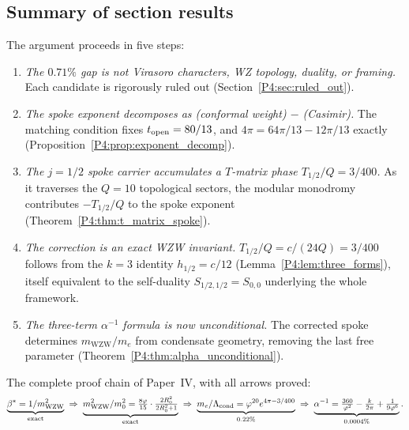 \documentclass[11pt,a4paper]{article}
\theoremstyle{definition}
\theoremstyle{remark}
\newcommand{\vp}{\varphi}
\newcommand{\bst}{\beta^{*}}
\newcommand{\aInv}{\alpha^{-1}}
\newcommand{\Lcond}{\Lambda_{\mathrm{cond}}}
\newcommand{\mWZW}{m_{\mathrm{WZW}}}
\begin{document}
\subsection{Summary of section results}
\label{P4:sec:t_matrix_summary}

The argument proceeds in five steps:

\begin{enumerate}[noitemsep]

\item
  \emph{The $0.71\%$ gap is not Virasoro characters, WZ topology, duality, or framing.}
  Each candidate is rigorously ruled out (Section~\ref{P4:sec:ruled_out}).

\item
  \emph{The spoke exponent decomposes as (conformal weight) $-$ (Casimir).}
  The matching condition fixes $t_{\rm open}=80/13$, and $4\pi = 64\pi/13 - 12\pi/13$
  exactly (Proposition~\ref{P4:prop:exponent_decomp}).

\item
  \emph{The $j=1/2$ spoke carrier accumulates a $T$-matrix phase $T_{1/2}/Q = 3/400$.}
  As it traverses the $Q=10$ topological sectors, the modular monodromy
  contributes $-T_{1/2}/Q$ to the spoke exponent (Theorem~\ref{P4:thm:t_matrix_spoke}).

\item
  \emph{The correction is an exact WZW invariant.}
  $T_{1/2}/Q = c/(24Q) = 3/400$ follows from the $k=3$ identity
  $h_{1/2}=c/12$ (Lemma~\ref{P4:lem:three_forms}), itself equivalent to the
  self-duality $S_{1/2,1/2}=S_{0,0}$ underlying the whole framework.

\item
  \emph{The three-term $\aInv$ formula is now unconditional.}
  The corrected spoke determines $\mWZW/m_e$ from condensate geometry,
  removing the last free parameter (Theorem~\ref{P4:thm:alpha_unconditional}).

\end{enumerate}

The complete proof chain of Paper~IV, with all arrows proved:
\begin{equation}
  \underbrace{\bst = 1/\mWZW^2}_{\rm exact}
  \;\Rightarrow\;
  \underbrace{\mWZW^2/m_0^2 = \tfrac{8\vp}{15}\cdot\tfrac{2R_0^2}{2R_0^2+1}}_{\rm exact}
  \;\Rightarrow\;
  \underbrace{m_e/\Lcond = \vp^{20}e^{4\pi-3/400}}_{0.22\%}
  \;\Rightarrow\;
  \underbrace{\aInv = \tfrac{360}{\vp^2}-\tfrac{k}{2\pi}+\tfrac{1}{9\vp^6}}_{0.0004\%}.
  \label{P4:eq:chain_final}
\end{equation}
\end{document}
